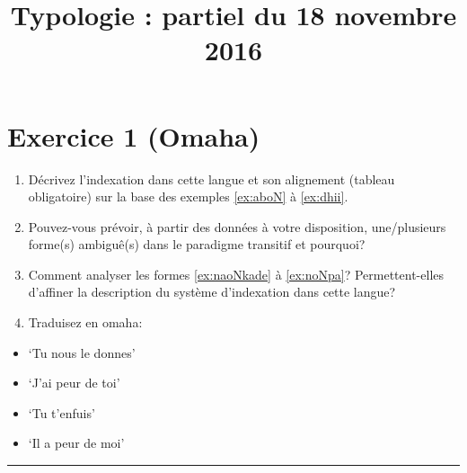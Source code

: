 \documentclass{article}
\begin{document}
\title{Typologie : partiel du 18 novembre 2016}
\date{}
\maketitle
 

\section*{Exercice 1 (Omaha)}

\begin{enumerate}
\item Décrivez l'indexation dans cette langue et son alignement (tableau obligatoire) sur la base des exemples \ref{ex:aboN} à \ref{ex:dhii}.
\item Pouvez-vous prévoir, à partir des données à votre disposition, une/plusieurs forme(s) ambiguê(s) dans le paradigme transitif et pourquoi?
\item Comment analyser les formes \ref{ex:naoNkade} à \ref{ex:noNpa}? Permettent-elles d'affiner la description du système d'indexation dans cette langue?
\item Traduisez en omaha:
\end{enumerate}
\begin{multicols}{2}
\begin{itemize}
\item `Tu nous le donnes'
\item `J'ai peur de toi'
\item `Tu t'enfuis'
\item `Il a peur de moi'
\end{itemize}
\end{multicols}
\hrule
\end{document}
